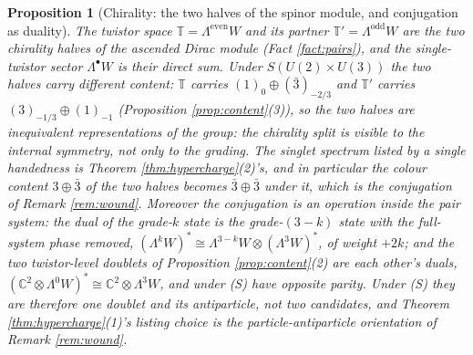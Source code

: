 \documentclass[11pt]{article}
\newtheorem{proposition}[theorem]{Proposition}
\theoremstyle{definition}
\newcommand{\C}{\mathbb{C}}
\newcommand{\T}{\mathbb{T}}
\begin{document}
\begin{proposition}[Chirality: the two halves of the spinor module, and conjugation as duality]\label{prop:chirality}
The twistor space $\T = \Lambda^{\mathrm{even}}W$ and its partner $\T' = \Lambda^{\mathrm{odd}}W$ are the two chirality halves of the ascended Dirac module (Fact \ref{fact:pairs}), and the single-twistor sector $\Lambda^{\bullet}W$ is their direct sum. Under $S(U(2) \times U(3))$ the two halves carry different content: $\T$ carries $(1)_{0} \oplus (\bar{3})_{-2/3}$ and $\T'$ carries $(3)_{-1/3} \oplus (1)_{-1}$ (Proposition \ref{prop:content}(3)), so the two halves are inequivalent representations of the group: the chirality split is visible to the internal symmetry, not only to the grading. The singlet spectrum listed by a single handedness is Theorem \ref{thm:hypercharge}(2)'s, and in particular the colour content $3 \oplus \bar{3}$ of the two halves becomes $\bar{3} \oplus \bar{3}$ under it, which is the conjugation of Remark \ref{rem:wound}. Moreover the conjugation is an operation inside the pair system: the dual of the grade-$k$ state is the grade-$(3-k)$ state with the full-system phase removed, $(\Lambda^{k}W)^{*} \cong \Lambda^{3-k}W \otimes (\Lambda^{3}W)^{*}$, of weight $+2k$; and the two twistor-level doublets of Proposition \ref{prop:content}(2) are each other's duals, $(\C^{2} \otimes \Lambda^{0}W)^{*} \cong \C^{2} \otimes \Lambda^{3}W$, and under (S) have opposite parity. Under (S) they are therefore one doublet and its antiparticle, not two candidates, and Theorem \ref{thm:hypercharge}(1)'s listing choice is the particle-antiparticle orientation of Remark \ref{rem:wound}.
\end{proposition}
\end{document}
